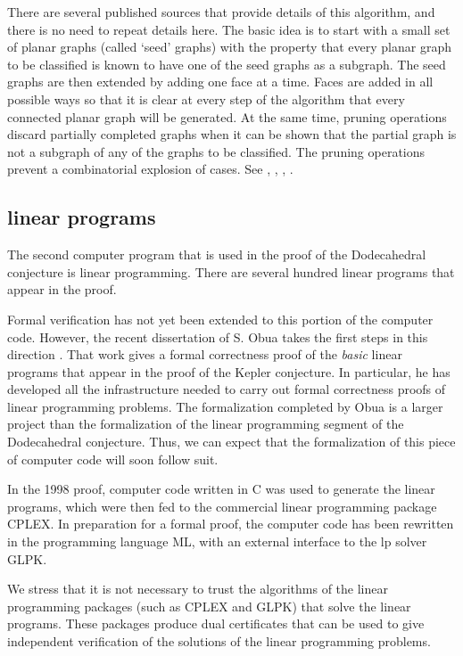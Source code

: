 There are several published sources that provide details of this
algorithm, and there is no need to repeat details here.   The basic idea is to start
with a small set of planar graphs  (called `seed' graphs) with
the property that every planar graph to be classified is known to have
one of the seed graphs as a subgraph.  The seed graphs are then
extended by adding one face at a time.  Faces are added in all
possible ways so that it is clear at every step of the algorithm
that every connected planar graph will be generated.  At the same time,
pruning operations discard partially completed graphs when it can
be shown that the partial graph is not a subgraph of any of the
graphs to be classified.  The pruning operations prevent a
combinatorial explosion of cases.
See \cite[sec.5]{alg}, \cite[sec.19]{DCG}, \cite{Bauer}, \cite{BN06}.



\subsection{linear programs}

The second computer 
program that is used in the proof of the Dodecahedral
conjecture is linear programming.  There are several hundred
linear programs that appear in the proof.

Formal verification has not yet been extended to this portion
of the computer code.  However, the recent dissertation of
S. Obua takes the first steps in this direction \cite{Ob}.
That work gives a formal correctness proof of the {\it basic} linear
programs that appear in the proof of the Kepler conjecture.
In particular, he has developed all the infrastructure needed to
carry out formal correctness proofs of linear programming problems.
The formalization  completed by Obua is a larger project than the
formalization of the linear programming segment of the Dodecahedral
conjecture.
Thus, we can expect that the formalization of this piece of
computer code  will soon follow suit.

In the 1998 proof, computer code written in C was used to generate
the linear programs, which were then fed to the 
commercial linear programming
package CPLEX.  In preparation for a formal proof, the computer
code has been rewritten in the programming language ML, with
an external interface to the lp solver GLPK.

We stress that it is not necessary to trust the algorithms of the
linear programming packages (such as CPLEX and GLPK) that solve
the linear programs.  These packages produce dual certificates that
can be used to give independent verification of the solutions
of the linear programming problems.

